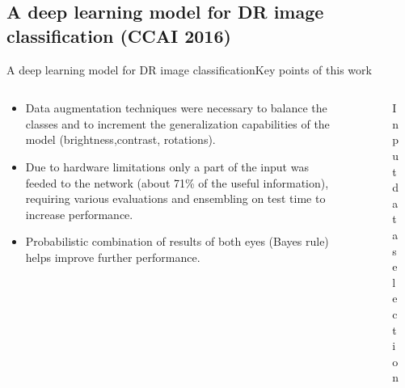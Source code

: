 \documentclass{beamer}
\begin{document}
\subsection{A deep learning model for DR image classification (CCAI 2016)}

\begin{frame}{A deep learning model for DR image classification}{Key points of this work}
	\begin{columns}
	\begin{column}{0.7\textwidth}
		\begin{itemize}
			\item Data augmentation techniques were necessary to balance the classes and to increment the generalization capabilities of the model (brightness,contrast, rotations).
			\item Due to hardware limitations only a part of the input was feeded to the network (about 71\% of the useful information), requiring various evaluations and ensembling on test time to increase performance.
			\item Probabilistic combination of results of both eyes (Bayes rule) helps improve further performance.
		\end{itemize}
	\end{column}
	\begin{column}{0.3\textwidth}
			\begin{figure}[p]
				\caption{Input data selection}
			\end{figure}
	\end{column}
	\end{columns}
\end{frame}
\end{document}
